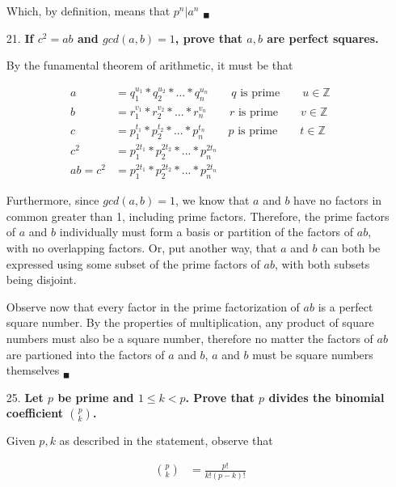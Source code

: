 \documentclass{article}
\begin{document}
\begin{enumerate}
					Which, by definition, means that $p^n | a^n$ $_{\blacksquare}$

		\item[21.]	\textbf{If $c^2 = ab$ and $gcd(a, b) = 1$, prove that $a, b$ are perfect 
					squares.} 

					By the funamental theorem of arithmetic, it must be that

					\begin{align*}
						a &= q_1^{u_1} * q_2^{u_2} * ... * q_n^{u_n}  
							\qquad q \text{ is prime} \qquad u \in \mathbb{Z}\\
						b &= r_1^{v_1} * r_2^{v_2} * ... * r_n^{v_n} 
							\qquad r \text{ is prime} \qquad v \in \mathbb{Z}\\
						c &= p_1^{t_1} * p_2^{t_2} * ... * p_n^{t_n} 
							\qquad p \text{ is prime} \qquad t \in \mathbb{Z}\\
						c^2 &= p_1^{2t_1} * p_2^{2t_2} * ... * p_n^{2t_n} \\
						ab = c^2 &= p_1^{2t_1} * p_2^{2t_2} * ... * p_n^{2t_n}
					\end{align*}

					Furthermore, since $gcd(a, b) = 1$, we know that $a$ and $b$ have no factors in 
					common greater than 1, including prime factors. Therefore, the prime factors of 
					$a$ and $b$ individually must form a basis or partition of the factors of $ab$, 
					with no overlapping factors. Or, put another way, that $a$ and $b$ can both be
					expressed using some subset of the prime factors of $ab$, with both subsets 
					being disjoint.

					Observe now that every factor in the prime factorization of $ab$ is a perfect 
					square number. By the properties of multiplication, any product of square
					numbers must also be a square number, therefore no matter the factors of $ab$
					are partioned into the factors of $a$ and $b$, $a$ and $b$ must be square
					numbers themselves $_{\blacksquare}$

		\item[25.]	\textbf{Let $p$ be prime and $1 \leq k < p$. Prove that $p$ divides the binomial
					coefficient $\binom{p}{k}$.}

					Given $p, k$ as described in the statement, observe that 

					\begin{align*}
						\binom{p}{k} &= \frac{p!}{k!(p-k)!}
					\end{align*}


\end{enumerate}
\end{document}
